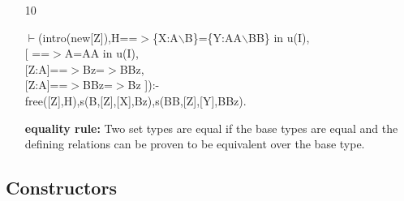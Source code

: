 \documentclass[11pt]{report}
\begin{document}
\begin{enumerate}
 \item[10]
\begin{sf}\begin{tabbing}
$\vdash$(intro(new[Z]),H==$>$\{X:A$\backslash$B\}=\{Y:AA$\backslash$BB\} in u(I),\\[-0.15ex]
\hspace{2em}[ ==$>$A=AA in u(I), \\[-0.15ex]
\hspace{3em}[Z:A]==$>$Bz=$>$BBz, \\[-0.15ex]
\hspace{3em}[Z:A]==$>$BBz=$>$Bz ]):-\\[-0.15ex]
\hspace{2em}free([Z],H),s(B,[Z],[X],Bz),s(BB,[Z],[Y],BBz).
\end{tabbing}\end{sf}

 {\bf equality rule:}
 Two set types are equal if the base types are equal and the
 defining relations can be proven to be equivalent over the
 base type.
 \end{enumerate}
  
 \subsection{Constructors}
  
\end{document}
